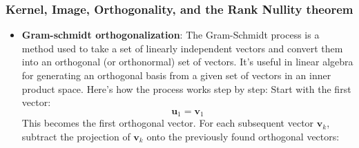 \documentclass{report}
\begin{document}
    \subsubsection{Kernel, Image, Orthogonality, and the Rank Nullity theorem}
    \begin{itemize}
         \item \textbf{Gram-schmidt orthogonalization}: The Gram-Schmidt process is a method used to take a set of linearly independent vectors and convert them into an orthogonal (or orthonormal) set of vectors. It's useful in linear algebra for generating an orthogonal basis from a given set of vectors in an inner product space. Here's how the process works step by step:
            \bigbreak \noindent 
            Start with the first vector:
            \[
                \mathbf{u}_1 = \mathbf{v}_1
            \]
            This becomes the first orthogonal vector.
            \bigbreak \noindent 
            For each subsequent vector \( \mathbf{v}_k \),
            \bigbreak \noindent 
            subtract the projection of \( \mathbf{v}_k \) onto the previously found orthogonal vectors:


\end{itemize}
\end{document}
